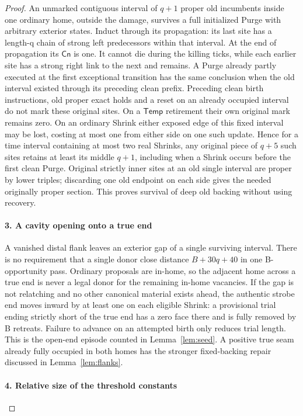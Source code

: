 \begin{proof}
An unmarked contiguous interval of \(q+1\) proper old incumbents inside one ordinary home, outside the damage, survives a full initialized Purge with arbitrary exterior states. Induct through its propagation: its last site has a length-q chain of strong left predecessors within that interval. At the end of propagation its \(\mathsf{Cn}\) is one. It cannot die during the killing ticks, while each earlier site has a strong right link to the next and remains. A Purge already partly executed at the first exceptional transition has the same conclusion when the old interval existed through its preceding clean prefix. Preceding clean birth instructions, old proper exact holds and a reset on an already occupied interval do not mark these original sites. On a \(\mathsf{Temp}\) retirement their own original mark remains zero. On an ordinary Shrink either exposed edge of this fixed interval may be lost, costing at most one from either side on one such update. Hence for a time interval containing at most two real Shrinks, any original piece of \(q+5\) such sites retains at least its middle \(q+1\), including when a Shrink occurs before the first clean Purge. Original strictly inner sites at an old single interval are proper by lower triples; discarding one old endpoint on each side gives the needed originally proper section. This proves survival of deep old backing without using recovery.

\paragraph{3. A cavity opening onto a true end}

A vanished distal flank leaves an exterior gap of a single surviving interval. There is no requirement that a single donor close distance \(B+30q+40\) in one B-opportunity pass. Ordinary proposals are in-home, so the adjacent home across a true end is never a legal donor for the remaining in-home vacancies. If the gap is not relatching and no other canonical material exists ahead, the authentic strobe end moves inward by at least one on each eligible Shrink: a provisional trial ending strictly short of the true end has a zero face there and is fully removed by B retreats. Failure to advance on an attempted birth only reduces trial length. This is the open-end episode counted in Lemma~\ref{lem:seed}. A positive true seam already fully occupied in both homes has the stronger fixed-backing repair discussed in Lemma~\ref{lem:flanks}.

\paragraph{4. Relative size of the threshold constants}


\end{proof}
